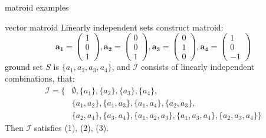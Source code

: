 \documentclass[11pt,xcolor=dvipsnames,table,dvipdfmx]{beamer}
\begin{document}
\begin{frame}{matroid examples}
 \begin{exampleblock}{vector matroid}
  Linearly independent sets construct matroid: \\
  \[
  \bm{a_1} = \left(
    \begin{array}{c}
      1 \\
      0 \\
      1
    \end{array}
  \right),
  \bm{a_2} = \left(
    \begin{array}{c}
      0 \\
      0 \\
      1
    \end{array}
  \right),
  \bm{a_3} = \left(
    \begin{array}{c}
      0 \\
      1 \\
      0
    \end{array}
  \right),
  \bm{a_4} = \left(
    \begin{array}{c}
      1 \\
      0 \\
      -1
    \end{array}
  \right)
  \]
  ground set $S$ is $\{a_1, a_2, a_3, a_4\}$, and $\mathcal{I}$ consists of linearly independent combinations, that:
  \begin{align*}
   \mathcal{I} = \{& \emptyset, \{a_1 \}, \{a_2 \}, \{a_3 \}, \{a_4 \}, \\
   &\{a_1, a_2 \}, \{a_1, a_3 \}, \{a_1, a_4\}, \{a_2, a_3 \}, \\
   &\{a_2, a_4 \}, \{a_3, a_4 \}, \{a_1, a_2, a_3 \}, \{a_1, a_3, a_4 \}, \{a_2, a_3, a_4 \}\}
  \end{align*}
  Then $\mathcal{I}$ satisfies (1), (2), (3).
 \end{exampleblock}
\end{frame}
\end{document}
